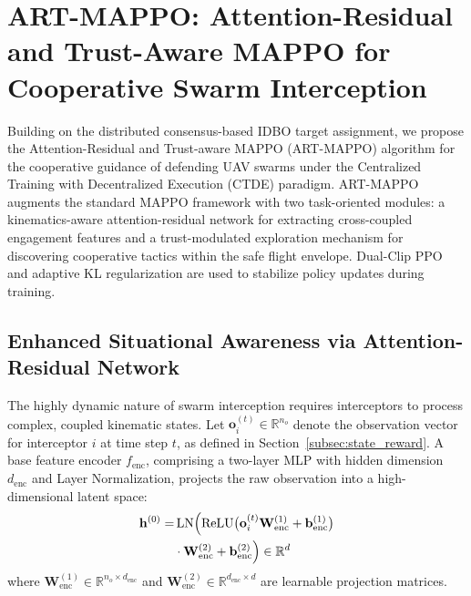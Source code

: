 \documentclass[lettersize,journal]{IEEEtran}
\begin{document}
\section{ART-MAPPO: Attention-Residual and Trust-Aware MAPPO for Cooperative Swarm Interception}
\label{sec:cooperative_algorithm}


Building on the distributed consensus-based IDBO target assignment, we propose
the Attention-Residual and Trust-aware MAPPO (ART-MAPPO) algorithm for the
cooperative guidance of defending UAV swarms under the Centralized Training
with Decentralized Execution (CTDE) paradigm. ART-MAPPO augments the standard
MAPPO framework with two
task-oriented modules: a kinematics-aware attention-residual network for
extracting cross-coupled engagement features and a
trust-modulated exploration mechanism for discovering cooperative tactics
within the safe flight envelope. Dual-Clip PPO and adaptive KL regularization are used to
stabilize policy updates during training.

\subsection{Enhanced Situational Awareness via Attention-Residual Network}
\label{subsec:attention_residual}

The highly dynamic nature of swarm interception requires interceptors to process complex, coupled kinematic states. Let $\mathbf{o}_i^{(t)} \in \mathbb{R}^{n_o}$ denote the observation vector for interceptor $i$ at time step $t$, as defined in Section~\ref{subsec:state_reward}. A base feature encoder $f_{\mathrm{enc}}$, comprising a two-layer MLP with hidden dimension $d_{\mathrm{enc}}$ and Layer Normalization, projects the raw observation into a high-dimensional latent space:
\begin{equation}
\label{eq:encoder}
\begin{split}
\mathbf{h}^{(0)} =& \operatorname{LN}\Bigl(\operatorname{ReLU}\bigl(\mathbf{o}_i^{(t)}\mathbf{W}_{\mathrm{enc}}^{(1)} + \mathbf{b}_{\mathrm{enc}}^{(1)}\bigr) \\
&\cdot \mathbf{W}_{\mathrm{enc}}^{(2)} + \mathbf{b}_{\mathrm{enc}}^{(2)}\Bigr) \in \mathbb{R}^{d}
\end{split}
\end{equation}
where $\mathbf{W}_{\mathrm{enc}}^{(1)} \in \mathbb{R}^{n_o \times d_{\mathrm{enc}}}$ and $\mathbf{W}_{\mathrm{enc}}^{(2)} \in \mathbb{R}^{d_{\mathrm{enc}} \times d}$ are learnable projection matrices.
\end{document}

